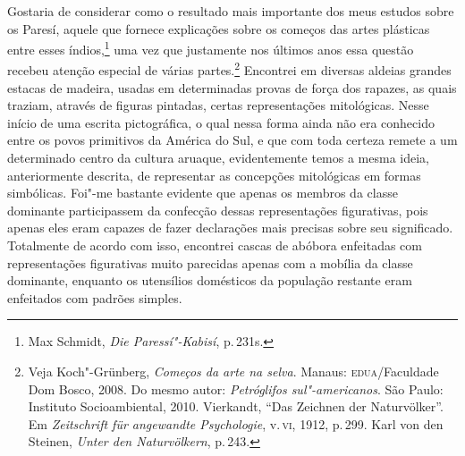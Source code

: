 Gostaria de considerar como o resultado mais importante dos meus
estudos sobre os Paresí, aquele que fornece explicações sobre os
começos das artes plásticas entre esses índios,\footnote{Max Schmidt,
  \textit{Die Paressí"-Kabisí}, p.\,231s.} uma vez que justamente nos últimos
anos essa questão recebeu atenção especial de várias partes.\footnote{Veja
  Koch"-Grünberg, \textit{Começos da arte na selva}. Manaus:
  \textsc{edua}/Faculdade Dom Bosco, 2008. Do mesmo autor:
  \textit{Petróglifos sul"-americanos}. São Paulo: Instituto
  Socioambiental, 2010. Vierkandt, ``Das Zeichnen der Naturvölker''. Em \textit{Zeitschrift für angewandte Psychologie}, v.\,\textsc{vi}, 1912, p.\,299. Karl von den
  Steinen, \textit{Unter den Naturvölkern}, p.\,243.} Encontrei em
diversas aldeias grandes estacas de madeira, usadas em determinadas
provas de força dos rapazes, as quais traziam, através de figuras
pintadas, certas representações mitológicas. Nesse início de uma escrita
pictográfica, o qual nessa forma ainda não era conhecido entre os povos
primitivos da América do Sul, e que com toda certeza remete a um
determinado centro da cultura aruaque, evidentemente temos a mesma
ideia, anteriormente descrita, de representar as concepções mitológicas
em formas simbólicas. Foi"-me bastante evidente que apenas os membros da
classe dominante participassem da confecção dessas representações
figurativas, pois apenas eles eram capazes de fazer declarações mais
precisas sobre seu significado. Totalmente de acordo com isso, encontrei
cascas de abóbora enfeitadas com representações figurativas muito
parecidas apenas com a mobília da classe dominante, enquanto os
utensílios domésticos da população restante eram enfeitados com padrões
simples.

